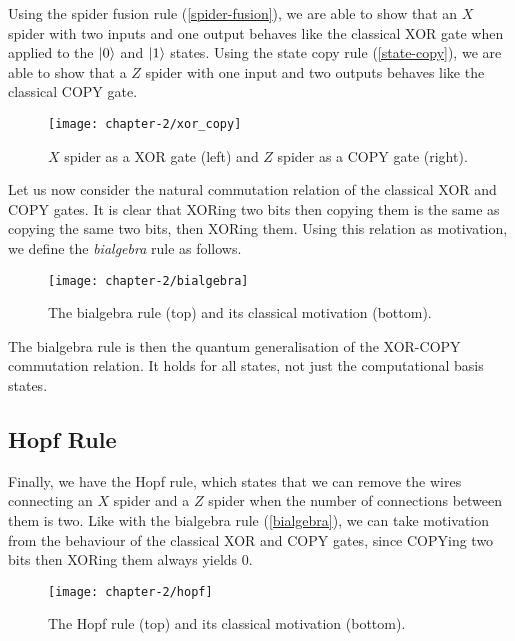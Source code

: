 Using the spider fusion rule (\ref{spider-fusion}), we are able to show that an $X$ spider with two inputs and one output behaves like the classical XOR gate when applied to the $\ket 0$ and $\ket 1$ states. Using the state copy rule (\ref{state-copy}), we are able to show that a $Z$ spider with one input and two outputs behaves like the classical COPY gate.
\begin{figure}[H]
    \centering
    \texttt{[image: chapter-2/xor\_copy]}
    \caption{$X$ spider as a XOR gate (left) and $Z$ spider as a COPY gate (right).}
\end{figure}

Let us now consider the natural commutation relation of the classical XOR and COPY gates. It is clear that XORing two bits then copying them is the same as copying the same two bits, then XORing them. Using this relation as motivation, we define the \textit{bialgebra} rule as follows.
\begin{figure}[H]
    \centering
    \texttt{[image: chapter-2/bialgebra]}
    \caption{The bialgebra rule (top) and its classical motivation (bottom).}
\end{figure}

The bialgebra rule is then the quantum generalisation of the XOR-COPY commutation relation. It holds for all states, not just the computational basis states.


\subsection{Hopf Rule}%
\label{hopf}

Finally, we have the Hopf rule, which states that we can remove the wires connecting an $X$ spider and a $Z$ spider when the number of connections between them is two. Like with the bialgebra rule (\ref{bialgebra}), we can take motivation from the behaviour of the classical XOR and COPY gates, since COPYing two bits then XORing them always yields 0.
\begin{figure}[H]
    \centering
    \texttt{[image: chapter-2/hopf]}
    \caption{The Hopf rule (top) and its classical motivation (bottom).}
\end{figure}

